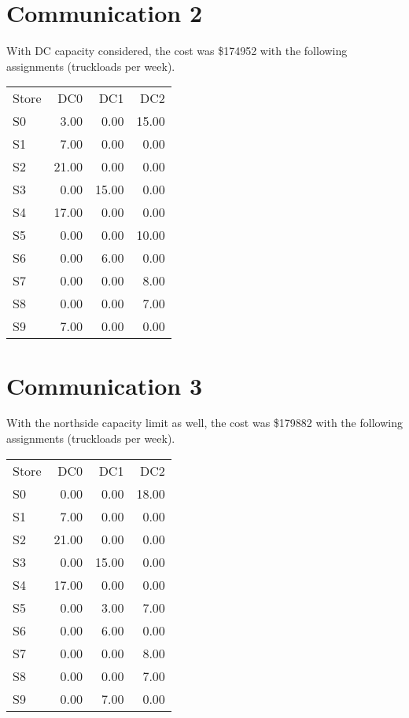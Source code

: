 \documentclass[11pt,a4paper]{article}
\begin{document}
\section{Communication 2}
With DC capacity considered, the cost was  \$174952 with 
the following assignments (truckloads per week). \\[0.8em]
\begin{tabular}{l  r  r  r }
    Store & DC0 & DC1 & DC2 \\
S0 & 3.00 & 0.00 & 15.00 \\
S1 & 7.00 & 0.00 & 0.00 \\
S2 & 21.00 & 0.00 & 0.00 \\
S3 & 0.00 & 15.00 & 0.00 \\
S4 & 17.00 & 0.00 & 0.00 \\
S5 & 0.00 & 0.00 & 10.00 \\
S6 & 0.00 & 6.00 & 0.00 \\
S7 & 0.00 & 0.00 & 8.00 \\
S8 & 0.00 & 0.00 & 7.00 \\
S9 & 7.00 & 0.00 & 0.00 \\
\end{tabular}

\section{Communication 3}
With the northside capacity limit as well, the cost was \$179882 with the following 
assignments (truckloads per week).\\[0.8em]
\begin{tabular}{l r r r}
    Store & DC0 & DC1 & DC2 \\
S0 & 0.00 & 0.00 & 18.00 \\
S1 & 7.00 & 0.00 & 0.00 \\
S2 & 21.00 & 0.00 & 0.00 \\
S3 & 0.00 & 15.00 & 0.00 \\
S4 & 17.00 & 0.00 & 0.00 \\
S5 & 0.00 & 3.00 & 7.00 \\
S6 & 0.00 & 6.00 & 0.00 \\
S7 & 0.00 & 0.00 & 8.00 \\
S8 & 0.00 & 0.00 & 7.00 \\
S9 & 0.00 & 7.00 & 0.00 \\
\end{tabular}
\end{document}

